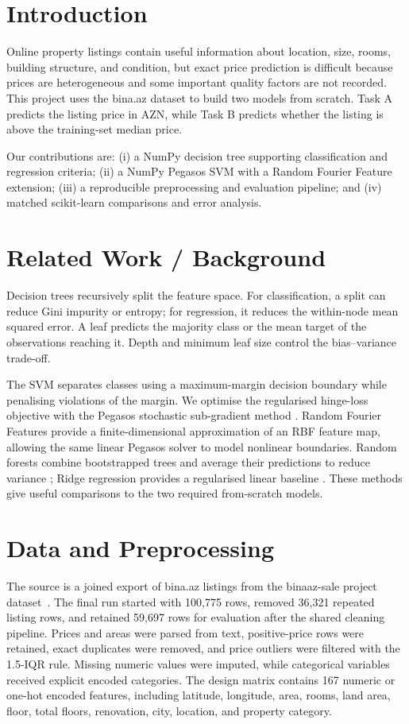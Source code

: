 \documentclass[10pt,twocolumn,a4paper]{article}
\begin{document}
\section{Introduction}
Online property listings contain useful information about location, size,
rooms, building structure, and condition, but exact price prediction is
difficult because prices are heterogeneous and some important quality
factors are not recorded. This project uses the bina.az dataset to build
two models from scratch. Task A predicts the listing price in AZN, while
Task B predicts whether the listing is above the training-set median price.

Our contributions are: (i) a NumPy decision tree supporting classification
and regression criteria; (ii) a NumPy Pegasos SVM with a Random Fourier
Feature extension; (iii) a reproducible preprocessing and evaluation
pipeline; and (iv) matched scikit-learn comparisons and error analysis.

\section{Related Work / Background}
Decision trees recursively split the feature space. For classification, a
split can reduce Gini impurity or entropy; for regression, it reduces the
within-node mean squared error. A leaf predicts the majority class or the
mean target of the observations reaching it. Depth and minimum leaf size
control the bias--variance trade-off.

The SVM separates classes using a maximum-margin decision boundary while
penalising violations of the margin. We optimise the regularised hinge-loss
objective with the Pegasos stochastic sub-gradient method
\cite{pegasos,cortes1995}. Random Fourier Features provide a finite-dimensional
approximation of an RBF feature map, allowing the same linear Pegasos
solver to model nonlinear boundaries. Random forests combine bootstrapped
trees and average their predictions to reduce variance
\cite{breiman2001}; Ridge regression provides a regularised linear baseline
\cite{hoerl1970}. These methods give useful comparisons to the two required
from-scratch models.

\section{Data and Preprocessing}
The source is a joined export of bina.az listings from the binaaz-sale
project dataset~\cite{binaaz}. The final run started
with 100,775 rows, removed 36,321 repeated listing rows, and retained
59,697 rows for evaluation after the shared cleaning pipeline. Prices and
areas were parsed from text, positive-price rows were retained, exact
duplicates were removed, and price outliers were filtered with the
1.5-IQR rule. Missing numeric values were imputed, while categorical
variables received explicit encoded categories. The design matrix contains
167 numeric or one-hot encoded features, including latitude, longitude,
area, rooms, land area, floor, total floors, renovation, city, location,
and property category.
\end{document}
